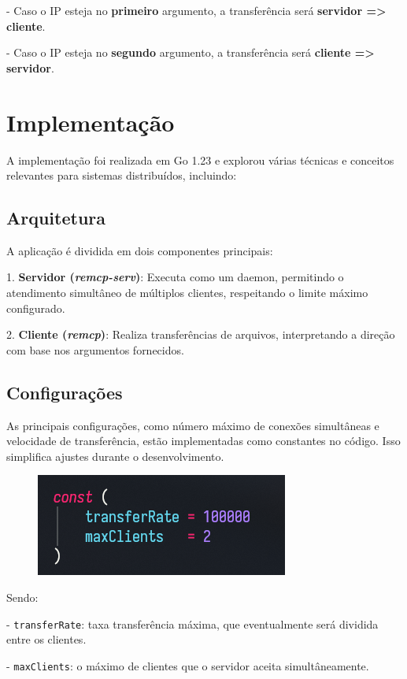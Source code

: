 \documentclass{article}
\begin{document}
- Caso o IP esteja no \textbf{primeiro} argumento, a transferência será \textbf{servidor => cliente}.

- Caso o IP esteja no \textbf{segundo} argumento, a transferência será \textbf{cliente => servidor}.

\section*{Implementação}

A implementação foi realizada em Go 1.23 e explorou várias técnicas e conceitos relevantes para sistemas distribuídos, incluindo:

\subsection*{Arquitetura}
A aplicação é dividida em dois componentes principais:

1. \textbf{Servidor (\textit{remcp-serv})}: Executa como um daemon, permitindo o atendimento simultâneo de múltiplos clientes, respeitando o limite máximo configurado.

2. \textbf{Cliente (\textit{remcp})}: Realiza transferências de arquivos, interpretando a direção com base nos argumentos fornecidos.

\subsection*{Configurações}
As principais configurações, como número máximo de conexões simultâneas e velocidade de transferência, estão implementadas como constantes no código.
Isso simplifica ajustes durante o desenvolvimento.

\begin{figure}[H]
	\centering
	\includegraphics{constantes.png}
\end{figure}

Sendo:

- \lstinline{transferRate}: taxa transferência máxima, que eventualmente será dividida entre os clientes.

- \lstinline{maxClients}: o máximo de clientes que o servidor aceita simultâneamente.
\end{document}
